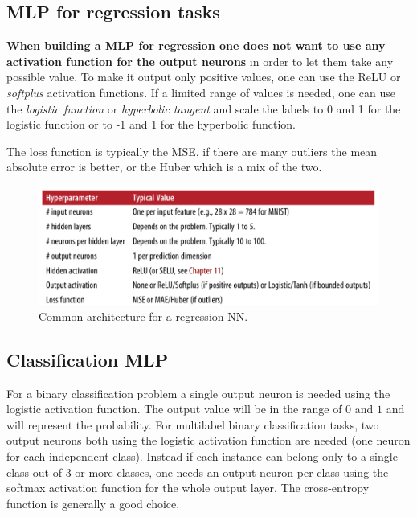 \documentclass[12pt, letterpaper]{article}
\theoremstyle{definition}
\let\ti\textit
\let\tb\textbf
\begin{document}


\subsection{MLP for regression tasks}
\tb{When building a MLP for regression one does not want to use any activation function for the output neurons} in order to let them take any possible value. To make it output only positive values, one can use the ReLU or \ti{softplus} activation functions. If a limited range of values is needed, one can use the \ti{logistic function} or \ti{hyperbolic tangent} and scale the labels to 0 and 1 for the logistic function or to -1 and 1 for the hyperbolic function.

The loss function is typically the MSE, if there are many outliers the mean absolute error is better, or the Huber which is a mix of the two.

\begin{figure}
\includegraphics[scale=0.4]{img/NNRegArchitecture}
\caption{Common architecture for a regression NN.}
\end{figure}

\subsection{Classification MLP}
For a binary classification problem a single output neuron is needed using the logistic activation function. The output value will be in the range of $0$ and $1$ and will represent the probability. For multilabel binary classification tasks, two output neurons  both using the logistic activation function are needed (one neuron for each independent class). Instead if each instance can belong only to a single class out of 3 or more classes, one needs an output neuron per class using the softmax activation function for the whole output layer. The cross-entropy function is generally a good choice.
\end{document}
